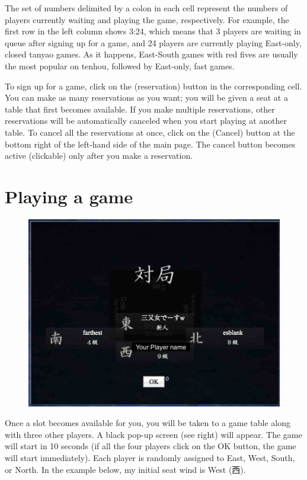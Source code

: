 \bigskip
The set of numbers delimited by a colon in each cell represent the numbers of players currently waiting and playing the game, respectively. For example, the first row in the left column shows 3:24, which means that 3 players are waiting in queue after signing up for a game, and 24 players are currently playing East-only, closed {\jap tanyao} games. As it happens, East-South games with red fives are usually the most popular on {\jap tenhou}, followed by East-only, fast games. 

\bigskip
To sign up for a game, click on the  (reservation) button in the corresponding cell. You can make as many reservations as you want; you will be given a seat at a table that first becomes available. If you make multiple reservations, other reservations will be automatically canceled when you start playing at another table. To cancel all the reservations at once, click on the  (Cancel) button at the bottom right of the left-hand side of the main page. The cancel button becomes active (clickable) only after you make a reservation. 

\section{Playing a game}

\begin{figure}
\vspace{-20pt}
\begin{center}
\includegraphics[width=.4\textwidth,clip]{figs/taikyoku.jpg}
\end{center}
\vspace{-20pt}
\end{figure}

Once a slot becomes available for you, you will be taken to a game table along with three other players. A black pop-up screen (see right) will appear. The game will start in 10 seconds (if all the four players click on the OK button, the game will start immediately). Each player is randomly assigned to East, West, South, or North. In the example below, my initial seat wind is West (西). 

